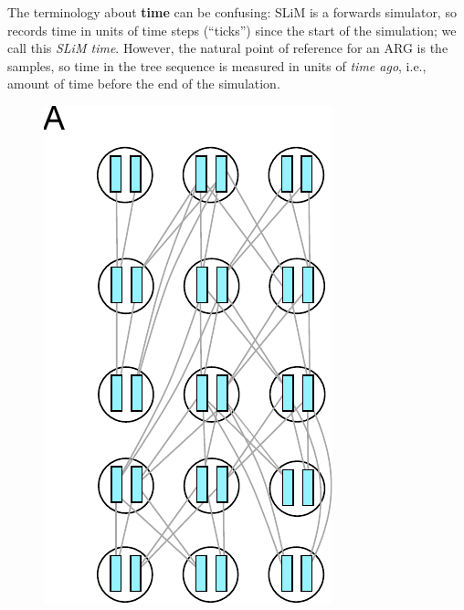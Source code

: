 \documentclass[12pt]{article}
\begin{document}
The terminology about \textbf{time} can be confusing:
SLiM is a forwards simulator, so records time in units of time steps (``ticks'')
since the start of the simulation;
we call this \textit{SLiM time}.
However, the natural point of reference for an ARG is the samples,
so time in the tree sequence is measured in units of \textit{time ago},
i.e., amount of time before the end of the simulation.

\begin{figure}
\centering
    \includegraphics{figures/pedigree0}

\end{figure}
\end{document}
